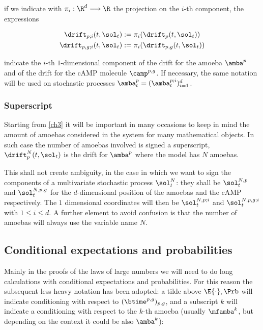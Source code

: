 \ie if we indicate with $\pi_i: \R^d \longrightarrow \R$ the projection on the $i$-th component, the expressions

\begin{gather*}
	\drift_{p; i}(t, \sol_t) : = \pi_i ( \drift_{p}(t, \sol_t) )
	\\
	\drift_{p,g; i}(t, \sol_t) := \pi_i ( \drift_{p,g}(t, \sol_t) )
\end{gather*}

indicate the $i$-th $1$-dimensional component of the drift for the amoeba $\amba^p$ and of the drift for the cAMP molecule $\camp^{p,g}$.
If necessary, the same notation will be used on stochastic processes $\amba_t^{p} = ( \amba_t^{p;i} )_{i =1}^d$. 

\subsubsection{Superscript}

Starting from \ref{ch3} it will be important in many occasions to keep in mind the amount of amoebas considered in the system for many mathematical objects.
In such case the number of amoebas involved is signed a superscript, \eg $\drift_{p}^N(t, \sol_t)$ is the drift for $\amba^p$ where the model has $N$ amoebas.

This shall not create ambiguity, in the case in which we want to sign the components of a multivariate stochastic process $\sol_t^N$: they shall be $\sol_t^{N,p}$ and  $\sol_t^{N,p,g}$ for the $d$-dimensional position of the amoebas and the cAMP respectively. The $1$ dimensional coordinates will then be $\sol_t^{N,p;i}$ and  $\sol_t^{N,p,g;i}$ with $1 \leq i \leq d$.
A further element to avoid confusion is that the number of amoebas will always use the variable name $N$.

\subsection{Conditional expectations and probabilities}

Mainly in the proofs of the laws of large numbers we will need to do long calculations with conditional expectations and probabilities.
For this reason the subsequent less heavy notation has been adopted: a tilde above $\E{\cdot}, \Prb$ will indicate conditioning with respect to $ (\btime^{p,g})_{p,g}$, and a subscript $k$ will indicate a conditioning with respect to the $k$-th amoeba (usually $\mfamba^k$, but depending on the context it could be also $\amba^k$):

